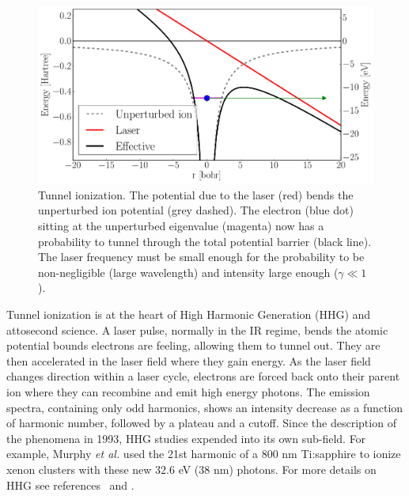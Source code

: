 \begin{figure}
 \centering
 \includegraphics[width=\figurewidth]{figures/ionization_tunnel}
 \caption{\label{fig:ionization:tunnel}Tunnel ionization. The potential
          due to the laser (red) bends the unperturbed ion potential
          (grey dashed). The electron (blue dot) sitting at the unperturbed
          eigenvalue (magenta) now has a probability to tunnel through the total
          potential barrier (black line). The laser frequency must be small
          enough for the probability to be non-negligible (large wavelength)
          and intensity large enough ($\gamma \ll 1$).}
\end{figure}

Tunnel ionization is at the heart of High Harmonic Generation (HHG) and
attosecond science\cite{Fennel2010}. A laser pulse, normally in the IR regime,
bends the atomic potential bounds electrons are feeling, allowing them to tunnel
out. They are then accelerated in the laser field where they gain energy.
As the laser field changes direction within a laser cycle,
electrons are forced back onto their parent ion
where they
%
can
%
recombine and emit high energy photons. The emission spectra,
containing only odd harmonics, shows an intensity decrease as a function of
harmonic number, followed by a plateau and a cutoff. Since the description
of the phenomena in 1993\cite{Corkum1993}, HHG studies expended into its own
sub-field. For example, Murphy \textit{et al.} used the 21st harmonic of a
800 nm Ti:sapphire to ionize xenon clusters\cite{Murphy2008a,Murphy2008b}
with these new 32.6 eV (38 nm) photons.
For more details on HHG see references~\cite{Levesque2006} and
\cite{Lewenstein2008}.


